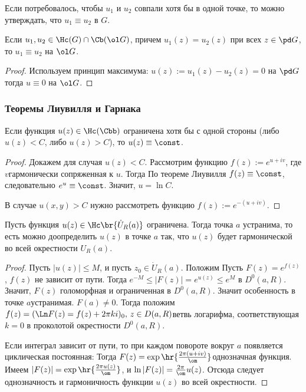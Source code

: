\documentclass[a4paper]{article}
\begin{document}
\begin{theorem}
Если потребовалось, чтобы $u_1$ и $u_2$ совпали хотя бы в одной точке,
  то можно утверждать, что $u_1\equiv u_2$ в $G$.

\begin{theorem}[3]
Если $u_1,u_2\in\Hc(G)\cap \Cb(\ol G)$, причем $u_1(z)=u_2(z)$ при всех $z\in \pd G$, то $u_1\equiv u_2$ на $\ol G$.
\end{theorem}
\begin{proof}
Используем принцип максимума: $u(z):=u_1(z)-u_2(z)=0$ на $\pd G$ тогда $u\equiv 0$ на
$\ol G$.
\end{proof}

\subsubsection{Теоремы Лиувилля и Гарнака}

\begin{theorem}[Лиувилль]
Если функция $u(z)\in\Hc(\Cbb)$ ограничена хотя бы с одной стороны ( либо $u(z)<C$, либо $u(z)>C$),
то $u(z)\equiv\const$.
\end{theorem}
\begin{proof}
Докажем для случая $u(z)<C$. Рассмотрим функцию $f(z) :=e^{u+iv}$, где $v$\т гармонически сопряженная к $u$. Тогда
По теореме Лиувилля $f(z)\equiv \const$, следовательно $e^u\equiv \const$. Значит, $u=\ln C$.

В случае $u(x,y)>C$ нужно рассмотреть функцию $f(z):=e^{-(u+iv)}$.
\end{proof}

\begin{theorem}[\^Гарнак]
Пусть функция $u(z)\in \Hc\br{\dot U_R(a)}$ ограничена. Тогда точка $a$ устранима,
то есть можно доопределить $u(z)$ в точке $a$ так, что $u(z)$ будет гармонической
во всей окрестности $U_R(a)$.
\end{theorem}
\begin{proof}
Пусть $|u(z)|\le M$, и пусть $z_0\in \dot U_R(a)$. Положим
Пусть $F(z)=e^{f(z)}$, $f(z)$ не зависит от пути.
Тогда $e^{-M}\le |F(z)|=e^{u(z)}\le e^M$ в $D^0(a,R)$.
Значит, $F(z)$ голоморфная и ограниченная в $D^0(a,R)$. Значит особенность в
точке $a$\т устранимая. $F(a)\neq 0$. Тогда положим
$f(z)=(\Ln F(z)=f(z)+2\pi ki)_0, \, z\in D(a,R)$\т ветвь логарифма,
соответствующая $k = 0$ в проколотой окрестности $D^0(a,R)$.

Если интеграл зависит от пути, то при каждом повороте вокруг $a$ появляется циклическая постоянная:
Тогда $F(z)=\exp\hr{\frac{2\pi(u+iv)}{\om}}$\т однозначная функция. Имеем
$|F(z)|=\exp\hr{\frac{2\pi u(z)}{\om}}$, и $\ln |F(z)|=\frac{2\pi}{\om}u(z)$.
Отсюда следует однозначность и гармоничность функции $u(z)$ во всей окрестности.
\end{proof}


\end{theorem}
\end{document}
